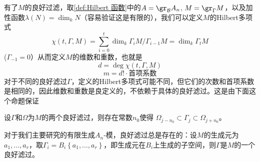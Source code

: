 有了$M$的良好过滤，取\ref{def:Hilbert 函数}中的$A=\gr_{\mathcal{B}}A_n$, $M=\gr_\Gamma M$，以及加性函数$\lambda(N)=\dim_k N$（容易验证这是有限的），我们可以定义$M$的Hilbert多项式
\begin{equation*}
    \chi(t,\Gamma,M)=\sum_{i=0}^t \dim_k \Gamma_i M/\Gamma_{i-1} M
    =
    \dim_k \Gamma_t M
\end{equation*}
($\Gamma_{-1}=0$）从而定义$M$的维数和重数，也就是
\begin{equation*}
    d=\deg \chi(t,\Gamma,M)
\end{equation*}
\begin{equation*}
    m=d!\cdot \text{首项系数}
\end{equation*}
对于不同的良好滤过$\Gamma$，定义的Hilbert多项式可能不同，但它们的次数和首项系数是相同的，因此维数和重数是良定义的，不依赖于具体的良好滤过。这是由下面这个命题保证
\begin{proposition}
    设$\Gamma$和$\Omega$为$M$的两个良好滤过，则存在常数$n_0$使得
    $\Omega_{j-n_0}\subset\Gamma_j\subset \Omega_{j+n_0}$。
\end{proposition}
对于我们主要研究的有限生成$A_n$-模，良好滤过总是存在的：设$M$的生成元为$a_1,\dots,a_r$，取$\Gamma_i=B_i\left\{a_1,\ldots,a_r\right\}$，即生成元在$B_i$上生成的子空间，则$\Gamma$是$M$的一个良好滤过。


